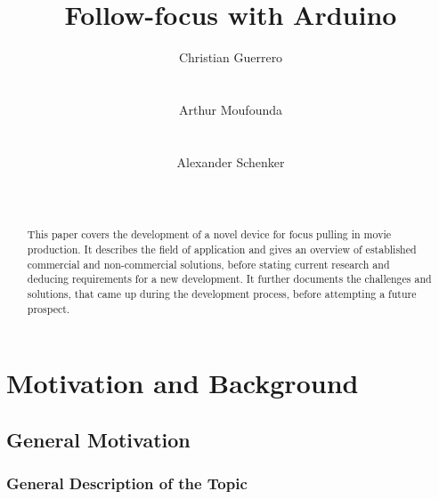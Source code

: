 \documentclass{sigchi}
\begin{document}
\title{Follow-focus with Arduino}

\author{
  \alignauthor Christian Guerrero\\
    \\
    \\
  \alignauthor Arthur Moufounda\\
    \\
    \\
  \alignauthor Alexander Schenker\\
    \\
    \\
}

\maketitle

\begin{abstract}

This paper covers the development of a novel device for focus pulling in movie production. It describes the field of application and gives an overview of established commercial and non-commercial solutions, before stating current research and deducing requirements for a new development. It further documents the challenges and solutions, that came up during the development process, before attempting a future prospect.

\end{abstract}


\section{Motivation and Background}

\subsection{General Motivation}

\subsubsection{General Description of the Topic}
\end{document}
